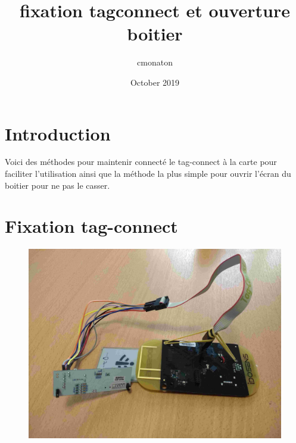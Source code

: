 \documentclass{article}
\title{fixation tagconnect et ouverture boitier}
\author{cmonaton }
\date{October 2019}
\begin{document}
\maketitle

\section{Introduction}

Voici des méthodes pour maintenir connecté le tag-connect à la carte pour faciliter l'utilisation ainsi que la méthode la plus simple pour ouvrir l'écran du boitier pour ne pas le casser.


\section{Fixation tag-connect}

\begin{figure}[H]
\begin{center}
\advance\leftskip-3cm
\advance\rightskip-3cm
\includegraphics[keepaspectratio=true,scale=0.1]{fixation_tagconnectface.jpg}
\label{visina8}
\end{center}\end{figure}
\end{document}

